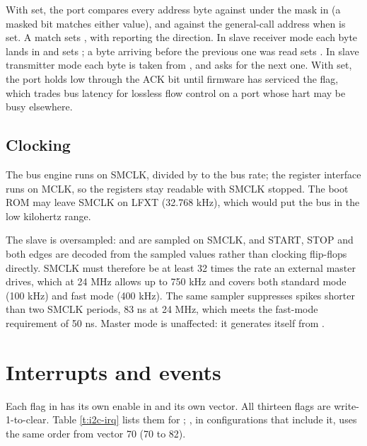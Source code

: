 With  set, the port compares every address byte against  under the mask in  (a masked bit matches either value), and against the general-call address when  is set. A match sets , with  reporting the direction. In slave receiver mode each byte lands in  and sets ; a byte arriving before the previous one was read sets . In slave transmitter mode each byte is taken from , and  asks for the next one. With  set, the port holds  low through the ACK bit until firmware has serviced the flag, which trades bus latency for lossless flow control on a port whose hart may be busy elsewhere.

\subsection{Clocking}

The bus engine runs on SMCLK, divided by  to the bus rate; the register interface runs on MCLK, so the registers stay readable with SMCLK stopped. The boot ROM may leave SMCLK on LFXT (32.768 kHz), which would put the bus in the low kilohertz range.

The slave is oversampled:  and  are sampled on SMCLK, and START, STOP and both  edges are decoded from the sampled values rather than clocking flip-flops directly. SMCLK must therefore be at least 32 times the  rate an external master drives, which at 24 MHz allows  up to 750 kHz and covers both standard mode (100 kHz) and fast mode (400 kHz). The same sampler suppresses spikes shorter than two SMCLK periods, 83 ns at 24 MHz, which meets the fast-mode requirement of 50 ns. Master mode is unaffected: it generates  itself from .

\section{Interrupts and events}

Each flag in  has its own enable in  and its own vector. All thirteen flags are write-1-to-clear. Table \ref{t:i2c-irq} lists them for ; , in configurations that include it, uses the same order from vector 70 (70 to 82).

